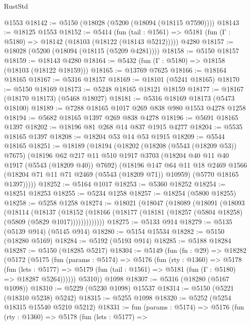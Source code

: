 \begin{lexlean}{RustStd}
\begin{coremodule}
    @1553
@18142 := @5150 (@18028 (@5200 (@18094 (@18115 @7590))))
@18143 := @18125 @1553
@18152 := @5414
    (fun (tail : @1561) => @5181 (fun (Γ : @5180) => @18142 (@18103 (@18122 (@18143 @5212)))))
    @4280
@18157 := @18028 (@5200 (@18094 (@18115 (@5209 @4281))))
@18158 := @5150 @18157
@18159 := @18143 @4280
@18164 := @5432 (fun (Γ : @5180) => @18158 (@18103 (@18122 @18159)))
@18165 := @13769 @7625
@18166 := @18164 @18165
@18167 := @5316 @18157
@18169 := @18101 (@5241 @18165)
@18170 := @5150 @18169
@18173 := @5248 @18165 @18121 @18159
@18177 := @18167 (@18170 @18173) (@5468 @18027)
@18181 := @5316 @18169 @18173 (@5473 @18100)
@18189 := @7288 @18165 @1017 @269 @838 @980 @1553 @4278 @1258
@18194 := @5682 @18165 @1397 @269 @838 @4278
@18196 := @5691 @18165 @1397
@18202 := @18196 @81 @268 @14 @837 @1915 @4277
@18204 := @5535 @18165 @1397
@18208 := @18204 @53 @14 @53 @1915
@18209 := @5544 @18165
@18251 := @18189
    (@18194
      (@18202
        (@18208 (@5543 (@18209 @53)) @7675)
        (@18196
          @62
          @217
          @11
          @510
          @1917
          @3703
          (@18204 @40 @11 @40 @1917 (@5543 (@18209 @40)) @7692)
          (@18196
            @147
            @64
            @11
            @18
            @2469
            @1566
            (@18204 @71 @11 @71 @2469 (@5543 (@18209 @71)) @10959)
            (@5770 @18165 @1397)))))
@18252 := @5164 @1017
@18253 := @5360 @18252
@18254 := @18251 @18253
@18255 := @5234 @1258
@18257 := @18254 (@5800 @18255)
@18258 := @5258 @1258
@18274 := @18021
    (@18047
      (@18089
        (@18091
          (@18093
            (@18114
              (@18137
                (@18152
                  (@18166 (@18177 (@18181 (@18257 (@5804 @18258) (@5809 (@5829 @1017)))))))))))))
@18275 := @5133 @914
@18279 := @5135 (@5139 @914) (@5145 @914)
@18280 := @5154 @15534
@18282 := @5150 (@18280 @5169)
@18284 := @5192 (@5193 @914)
@18285 := @5188 @18284
@18287 := @5150 (@18285 @5217)
@18304 := @5149
    (fun (fn : @29) =>
    @18282
      (@5172
        (@5175
          (fun (params : @5174) =>
          @5176
            (fun (rty : @1360) =>
            @5178
              (fun (lets : @5177) =>
              @5179 (fun (tail : @1561) => @5181 (fun (Γ : @5180) => @18287 @5264))))))
        @5310))
    @1098
@18307 := @5316 (@18280 (@5167 @1098))
@18310 := @5229 (@5230 @1098) @15537
@18314 := @5150 (@5221 (@18310 @5238) @5242)
@18315 := @5255 @1098
@18320 := @5252 (@5254 @18315 @15540 @5210 @5212)
@18331 := fun (params : @5174) =>
  @5176
    (fun (rty : @1360) =>
    @5178
      (fun (lets : @5177) =>

\end{coremodule}
\end{lexlean}
